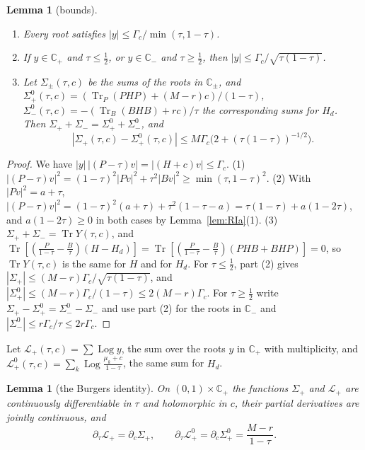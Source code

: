 \documentclass[11pt]{amsart}
\newtheorem{lemma}[theorem]{Lemma}
\theoremstyle{definition}
\theoremstyle{remark}
\numberwithin{equation}{section}
\newcommand{\C}{\mathbb{C}}
\newcommand{\Tr}{\operatorname{Tr}}
\begin{document}
\begin{lemma}[bounds]\label{lem:RIb}
\begin{enumerate}
\item Every root satisfies $|y|\le\Gamma_c/\min(\tau,1-\tau)$.
\item If $y\in\C_+$ and $\tau\le\frac12$, or $y\in\C_-$ and $\tau\ge\frac12$, then $|y|\le\Gamma_c/\sqrt{\tau(1-\tau)}$.
\item Let $\Sigma_\pm(\tau,c)$ be the sums of the roots in $\C_\pm$, and $\Sigma^0_+(\tau,c)=(\Tr_P(PHP)+(M-r)c)/(1-\tau)$,
$\Sigma^0_-(\tau,c)=-(\Tr_B(BHB)+rc)/\tau$ the corresponding sums for $H_d$. Then $\Sigma_++\Sigma_-=\Sigma^0_++\Sigma^0_-$, and
\[
|\Sigma_+(\tau,c)-\Sigma^0_+(\tau,c)|\le M\Gamma_c\bigl(2+(\tau(1-\tau))^{-1/2}\bigr).
\]
\end{enumerate}
\end{lemma}

\begin{proof}
We have $|y|\,|(P-\tau)v|=|(H+c)v|\le\Gamma_c$. (1) $|(P-\tau)v|^2=(1-\tau)^2|Pv|^2+\tau^2|Bv|^2\ge\min(\tau,1-\tau)^2$.
(2) With $|Pv|^2=a+\tau$, $|(P-\tau)v|^2=(1-\tau)^2(a+\tau)+\tau^2(1-\tau-a)=\tau(1-\tau)+a(1-2\tau)$, and $a(1-2\tau)\ge0$
in both cases by Lemma~\ref{lem:RIa}(1). (3) $\Sigma_++\Sigma_-=\Tr Y(\tau,c)$, and
$\Tr[(\frac P{1-\tau}-\frac B\tau)(H-H_d)]=\Tr[(\frac P{1-\tau}-\frac B\tau)(PHB+BHP)]=0$, so $\Tr Y(\tau,c)$ is the same for $H$
and for $H_d$. For $\tau\le\frac12$, part (2) gives $|\Sigma_+|\le(M-r)\Gamma_c/\sqrt{\tau(1-\tau)}$, and
$|\Sigma^0_+|\le(M-r)\Gamma_c/(1-\tau)\le2(M-r)\Gamma_c$. For $\tau\ge\frac12$ write $\Sigma_+-\Sigma^0_+=\Sigma^0_--\Sigma_-$
and use part (2) for the roots in $\C_-$ and $|\Sigma^0_-|\le r\Gamma_c/\tau\le2r\Gamma_c$.
\end{proof}

Let $\mathcal L_+(\tau,c)=\sum\operatorname{Log}y$, the sum over the roots $y$ in $\C_+$ with multiplicity, and
$\mathcal L^0_+(\tau,c)=\sum_k\operatorname{Log}\frac{\mu_k+c}{1-\tau}$, the same sum for $H_d$.

\begin{lemma}[the Burgers identity]\label{lem:RIc}
On $(0,1)\times\C_+$ the functions $\Sigma_+$ and $\mathcal L_+$ are continuously differentiable in $\tau$ and holomorphic
in $c$, their partial derivatives are jointly continuous, and
\[
\partial_\tau\mathcal L_+=\partial_c\Sigma_+,\qquad \partial_\tau\mathcal L^0_+=\partial_c\Sigma^0_+=\frac{M-r}{1-\tau}.
\]
\end{lemma}
\end{document}
